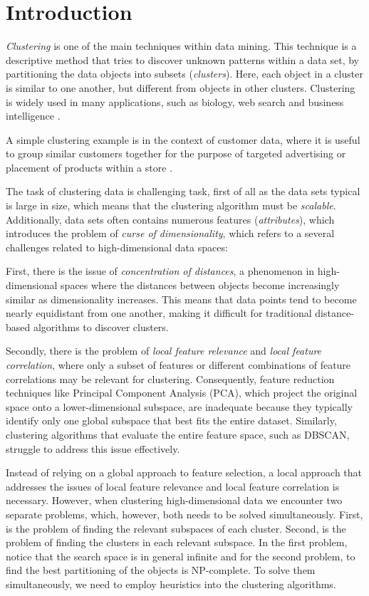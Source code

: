 \section{Introduction}
\textit{Clustering} is one of the main techniques within data mining. This technique is a descriptive method that tries to discover unknown patterns within a data set, by partitioning the data objects into subsets (\textit{clusters}). Here, each object in a cluster is similar to one another, but different from objects in other clusters. Clustering is widely used in many applications, such as biology, web search and business intelligence \cite[p.~444]{han-2011}.

A simple clustering example is in the context of customer data, where it is useful to group similar customers together for the purpose of targeted advertising or placement of products within a store \cite[p.~5]{kriegel-2009}.

The task of clustering data is challenging task, first of all as the data sets typical is large in size, which means that the clustering algorithm must be \textit{scalable}. Additionally, data sets often contains numerous features (\textit{attributes}), which introduces the problem of \textit{curse of dimensionality}, which refers to a several challenges related to high-dimensional data spaces:

First, there is the issue of \textit{concentration of distances}, a phenomenon in high-dimensional spaces where the distances between objects become increasingly similar as dimensionality increases. This means that data points tend to become nearly equidistant from one another, making it difficult for traditional distance-based algorithms to discover clusters.

Secondly, there is the problem of \textit{local feature relevance} and \textit{local feature correlation}, where only a subset of features or different combinations of feature correlations may be relevant for clustering. Consequently, feature reduction techniques like Principal Component Analysis (PCA), which project the original space onto a lower-dimensional subspace, are inadequate because they typically identify only one global subspace that best fits the entire dataset. Similarly, clustering algorithms that evaluate the entire feature space, such as DBSCAN, struggle to address this issue effectively. \cite[p.~43--46]{kriegel-2009}

Instead of relying on a global approach to feature selection, a local approach that addresses the issues of local feature relevance and local feature correlation is necessary. However, when clustering high-dimensional data we encounter two separate problems, which, however, both needs to be solved simultaneously. First, is the problem of finding the relevant subspaces of each cluster. Second, is the problem of finding the clusters in each relevant subspace. In the first problem, notice that the search space is in general infinite and for the second problem, to find the best partitioning of the objects is NP-complete. To solve them simultaneously, we need to employ heuristics into the clustering algorithms. \cite[p.~6--7]{kriegel-2009}

